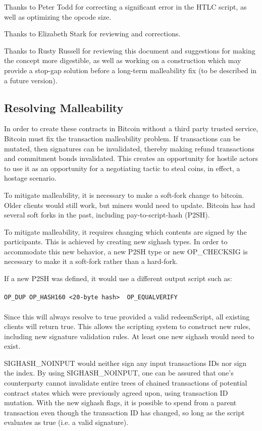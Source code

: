 \documentclass[letterpaper,11pt]{article}
\begin{document}
Thanks to Peter Todd for correcting a significant error in the HTLC script, as
well as optimizing the opcode size.

Thanks to Elizabeth Stark for reviewing and corrections.

Thanks to Rusty Russell for reviewing this document and suggestions for making
the concept more digestible, as well as working on a construction which may
provide a stop-gap solution before a long-term malleability fix (to be described
in a future version).

\begin{appendices}
\section{Resolving Malleability}

In order to create these contracts in Bitcoin without a third party trusted
service, Bitcoin must fix the transaction malleability problem. If transactions
can be mutated, then signatures can be invalidated, thereby making refund
transactions and commitment bonds invalidated. This creates an opportunity for
hostile actors to use it as an opportunity for a negotiating tactic to steal
coins, in effect, a hostage scenario.

To mitigate malleability, it is necessary to make a soft-fork change to bitcoin.
Older clients would still work, but miners would need to update. Bitcoin has had
several soft forks in the past, including pay-to-script-hash (P2SH).

To mitigate malleability, it requires changing which contents are signed by the
participants. This is achieved by creating new sighash types. In order to
accommodate this new behavior, a new P2SH type or new OP\_CHECKSIG is necessary
to make it a soft-fork rather than a hard-fork. 

If a new P2SH was defined, it would use a different output script such as:
\\\\
\noindent\texttt{OP\_DUP OP\_HASH160 \textless 20-byte hash\textgreater
~OP\_EQUALVERIFY}
\\\\

Since this will always resolve to true provided a valid redeemScript, all
existing clients will return true. This allows the scripting system to construct
new rules, including new signature validation rules. At least one new sighash
would need to exist.

SIGHASH\_NOINPUT would neither sign any input transactions IDs nor sign the
index. By using SIGHASH\_NOINPUT, one can be assured that one's counterparty
cannot invalidate entire trees of chained transactions of potential contract
states which were previously agreed upon, using transaction ID mutation. With
the new sighash flags, it is possible to spend from a parent transaction even
though the transaction ID has changed, so long as the script evaluates as true
(i.e. a valid signature).


\end{appendices}
\end{document}
